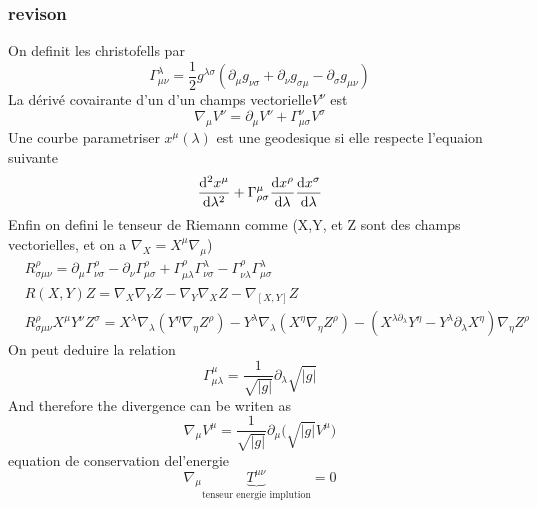 \documentclass{article}
\begin{document}
\subsubsection{revison}
On definit les christofells par
\begin{equation}
    \Gamma_{\mu \nu}^{\lambda} = \frac{1}{2}g^{\lambda \sigma}(\partial_{\mu}g_{\nu \sigma}+\partial_{\nu}g_{\sigma \mu} - \partial_{\sigma}g_{\mu \nu})
\end{equation}
La dérivé covairante d'un d'un champs vectorielle$ V^{\nu}$ est
\begin{equation}
    \nabla_{\mu}V^{\nu}= \partial_{\mu}V^{\nu}+\Gamma^{\nu}_{\mu \sigma}V^{\sigma}
\end{equation}
Une courbe parametriser $x^{\mu}(\lambda)$ est une geodesique si elle respecte l'equaion suivante
\begin{equation}
    \dv[2]{x^{\mu}}{\lambda} + \Gamma^{\mu}_{\rho \sigma}\dv{x^{\rho}}{\lambda}\dv{x^{\sigma}}{\lambda}
\end{equation}
Enfin on defini le tenseur de Riemann comme (X,Y, et Z sont des champs vectorielles, et on a $\nabla_X = X^{\mu}\nabla_{\mu}$)
\begin{align}
    &R^{\rho}_{\sigma \mu \nu} = \partial_{\mu}\Gamma^{\rho}_{\nu \sigma}-\partial_{\nu}\Gamma^{\rho}_{\mu\sigma}+\Gamma^{\rho}_{\mu \lambda}\Gamma^{\lambda}_{\nu \sigma}-\Gamma^{\rho}_{\nu \lambda}\Gamma^{\lambda}_{\mu \sigma}\\
    &R(X,Y)Z = \nabla_X \nabla_Y Z-\nabla_Y \nabla_X Z - \nabla_{[X,Y]}Z\\
    &R^{\rho}_{\sigma\mu\nu}X^{\mu}Y^{\nu}Z^{\sigma} = X^{\lambda}\nabla_{\lambda}(Y^{\eta}\nabla_{\eta}Z^{\rho})-Y^{\lambda}\nabla_{\lambda}(X^{\eta}\nabla_{\eta}Z^{\rho})-(X^{\lambda\partial_{\lambda}}Y^{\eta}-Y^{\lambda}\partial_{\lambda}X^{\eta})\nabla_{\eta}Z^{\rho}
\end{align}
On peut deduire la relation
\begin{equation}
    \Gamma^{\mu}_{\mu \lambda} = \frac{1}{\sqrt{|g|}}\partial_{\lambda}\sqrt{|g|}
\end{equation}
And therefore the divergence can be writen as 
\begin{equation}
    \nabla_{\mu}V^{\mu}= \frac{1}{\sqrt{|g|}}\partial_{\mu}\Big(\sqrt{|g|}V^{\mu} \Big)
\end{equation}
equation de conservation del'energie
\begin{equation}
    \nabla_{\mu}\underbrace{T^{\mu \nu}}_{\text{tenseur energie implution}} = 0
\end{equation}
\end{document}
